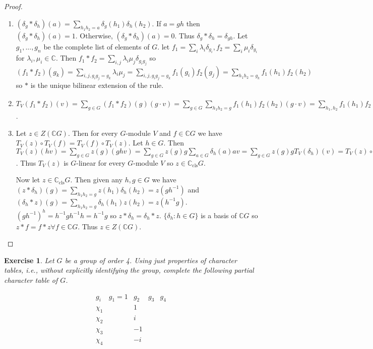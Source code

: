 \documentclass{article}
\newtheorem{exercise}[theorem]{Exercise}
\begin{document}
\begin{proof}
\begin{enumerate}
    \item $(\delta_g * \delta_h)(a)=\sum_{h_1h_2=a}\delta_g(h_1)\delta_h(h_2)$. If $a=gh$ then $(\delta_g * \delta_h)(a)=1$. Otherwise, $(\delta_g * \delta_h)(a)=0$. Thus $\delta_g * \delta_h=\delta_{gh}$. Let $g_1,...,g_n$ be the complete list of elements of $G$. let $f_1=\sum_i\lambda_i\delta_{g_i},f_2=\sum_i\mu_i\delta_{g_i}$ for $\lambda_i,\mu_i\in\mathbb{C}$. Then $f_1*f_2=\sum_{i,j}\lambda_i\mu_j\delta_{g_ig_j}$ so $(f_1*f_2)(g_k)=\sum_{i,j,g_ig_j=g_k}\lambda_i\mu_j=\sum_{i,j,g_ig_j=g_k}f_1(g_i)f_2(g_j)=\sum_{h_1h_2=g_k}f_1(h_1)f_2(h_2)$ so $*$ is the unique bilinear extension of the rule.
    \item $T_V(f_1*f_2)(v)=\sum_{g\in G}(f_1*f_2)(g)(g\cdot v)=\sum_{g\in G}\sum_{h_1h_2=g}f_1(h_1)f_2(h_2)(g\cdot v)=\sum_{h_1,h_2}f_1(h_1)f_2(h_2)((h_1h_2)\cdot v)=\sum_{h_1}f_1(h_1)\sum_{h_2}f_2(h_2)(h_1\cdot(h_2\cdot v))=\sum_{h_1}f_1(h_1)h_1\cdot(\sum_{h_2}f_2(h_2)h_2\cdot v)=\sum_{h_1}f_1(h_1)h_1\cdot T_V(f_2)(v)=T_V(f_1)\circ T_V(f_2)(v)\forall v\in V$.
    \item Let $z\in Z(\mathbb{C}G)$. Then for every $G$-module $V$ and $f\in \mathbb{C}G$ we have $T_V(z)\circ T_V(f)=T_V(f)\circ T_V(z)$. Let $h\in G$. Then $T_V(z)(hv)=\sum_{g\in G}z(g)(gh v)=\sum_{g\in G}z(g)g\sum_{a\in G}\delta_h(a) av=\sum_{g\in G}z(g)gT_V(\delta_h)(v)=T_V(z)\circ T_V(\delta_h)(v)=T_V(\delta_h)\circ T_V(z)(v)=\sum_{g\in G}\delta_h(g)gT_V(z)(v)=hT_V(z)(v)\forall v\in V$. Thus $T_V(z)$ is $G$-linear for every $G$-module $V$ so $z\in\mathbb{C}_\text{cls}G$.

    Now let $z\in\mathbb{C}_\text{cls}G$. Then given any $h,g\in G$ we have $(z*\delta_h)(g)=\sum_{h_1h_2=g}z(h_1)\delta_h(h_2)=z(gh^{-1})$ and $(\delta_h*z)(g)=\sum_{h_1h_2=g}\delta_h(h_1)z(h_2)=z(h^{-1}g)$. $(gh^{-1})^h=h^{-1}gh^{-1}h=h^{-1}g$ so $z*\delta_h=\delta_h*z$. $\{\delta_h:h\in G\}$ is a basis of $\mathbb{C}G$ so $z*f=f*z\forall f\in\mathbb{C}G$. Thus $z\in Z(\mathbb{C}G)$.
\end{enumerate}
\end{proof}
\begin{exercise}
    Let \( G \) be a group of order 4. Using just properties of character tables, i.e., without explicitly identifying the group, complete the following partial character table of \( G \).

    \[
    \begin{array}{c|cccc}
    g_i & g_1 = 1 & g_2 & g_3 & g_4 \\
    \hline
    \chi_1 &  & 1 &  &  \\
    \chi_2 &  & i &  &  \\
    \chi_3 &  & -1 &  &  \\
    \chi_4 &  & -i &  &  \\
    \end{array}
    \]
\end{exercise}
\end{document}
